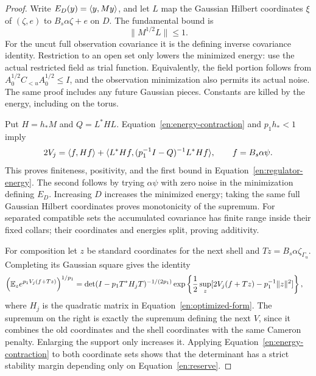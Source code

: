 \begin{proof}
Write $E_D(y)=\langle y,My\rangle$, and let $L$ map the Gaussian Hilbert
coordinates $\xi$ of $(\zeta,e)$ to $B_s\alpha\zeta+e$ on $D$.
The fundamental bound is
\begin{equation}\label{en:energy-contraction}
                       \|M^{1/2}L\|\leq1.
\end{equation}
For the uncut full observation covariance it is the defining inverse
covariance identity.  Restriction to an open set only lowers the
minimized energy: use the actual restricted field as trial function.
Equivalently, the field portion follows from
$A_0^{1/2}C_{<u}A_0^{1/2}\leq I$, and the observation minimization
also permits its actual noise.  The same proof includes any future
Gaussian pieces.  Constants are killed by the energy, including on
the torus.

Put $H=h_*M$ and $Q=L^*HL$.  Equation~\eqref{en:energy-contraction}
and $p_1h_*<1$ imply
\begin{equation}\label{en:optimized-form}
 2V_j=\langle f,Hf\rangle
 +\langle L^*Hf,(p_1^{-1}I-Q)^{-1}L^*Hf\rangle,
                         \qquad f=B_s\alpha\psi.
\end{equation}
This proves finiteness, positivity, and the first bound in
Equation~\eqref{en:regulator-energy}.  The second follows by trying
$\alpha\psi$ with zero noise in the minimization defining $E_D$.
Increasing $D$ increases the minimized energy; taking the same full
Gaussian Hilbert coordinates proves monotonicity of the supremum.
For separated compatible sets the accumulated covariance has finite
range inside their fixed collars; their coordinates and energies
split, proving additivity.

For composition let $z$ be standard coordinates for the next shell
and $Tz=B_s\alpha\zeta_{\Gamma_u}$.  Completing its Gaussian square
gives the identity
\begin{align}\label{en:sup-composition}
 \left(\mathbb E_z e^{p_1V_j(f+Tz)}\right)^{1/p_1}
 &=\det(I-p_1T^*H_jT)^{-1/(2p_1)}
   \exp\left\{\frac12\sup_z
           [2V_j(f+Tz)-p_1^{-1}\|z\|^2]\right\},
\end{align}
where $H_j$ is the quadratic matrix in Equation~\eqref{en:optimized-form}.
The supremum on the right is exactly the supremum defining the next
$V$, since it combines the old coordinates and the shell coordinates
with the same Cameron penalty.  Enlarging the support only increases
it.  Applying Equation~\eqref{en:energy-contraction} to both coordinate
sets shows that the determinant has a strict stability margin depending
only on Equation~\eqref{en:reserve}.


\end{proof}
